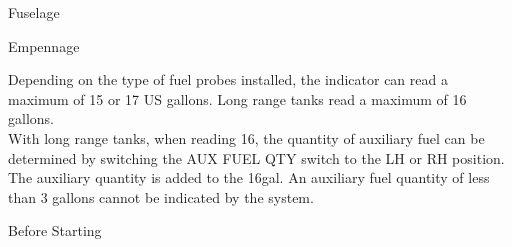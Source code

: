 \documentclass[10pt]{article}
\begin{document}
\pagebreak

\centerline{{\Large \sc Fuselage }}

\smallskip

\begin{center}
\end{center}

\bigskip

\centerline{{\Large \sc Empennage }}

\smallskip

\begin{center}
\end{center}

\smallskip

\noindent
\hrulefill

\noindent Depending on the type of fuel probes installed, the indicator can read
a maximum of 15 or 17 US gallons. Long range tanks read a maximum of 16 gallons.
\\

\noindent With long range tanks, when reading 16, the quantity of auxiliary
fuel can be determined by switching the AUX FUEL QTY switch to the LH or RH
position. The auxiliary quantity is added to the 16gal. An auxiliary fuel
quantity of less than 3 gallons cannot be indicated by the system. \\

\pagebreak

\centerline{{\Huge \sc Before Starting}}
\end{document}
